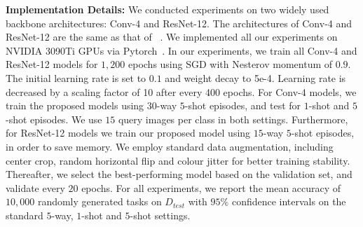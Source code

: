 \documentclass[letterpaper]{article} %
\begin{document}
\textbf{Implementation Details:}
{We conducted experiments on two widely used backbone architectures: Conv-4 and ResNet-12. The architectures of Conv-4 and ResNet-12 are the same as that of ~\cite{Wertheimer_2021_CVPR, Ye_2020_CVPR}.
We implemented all our experiments on NVIDIA 3090Ti GPUs via Pytorch~\cite{Paszke2019PyTorchAI}.
In our experiments, we train all Conv-4 and ResNet-12 models for $1,200$ epochs using SGD with Nesterov momentum of $0.9$. The initial learning rate is set to $0.1$ and weight decay to 5e-4. Learning rate is decreased by a scaling factor of 10 after every 400 epochs.
For Conv-4 models, we train the proposed models using $30$-way $5$-shot episodes, and test for $1$-shot and $5$-shot episodes. We use $15$ query images per class in both settings.
Furthermore, for ResNet-12 models we train our proposed model using $15$-way $5$-shot episodes, in order to save memory.
We employ standard data augmentation, including center crop, random horizontal flip and colour jitter for better training stability. Thereafter, we select the best-performing model based on the validation set, and validate every $20$ epochs. For all experiments, we report the mean accuracy of $10,000$ randomly generated tasks on $D_{test}$ with $95\%$ confidence intervals on the standard $5$-way, $1$-shot and $5$-shot settings.}
\end{document}
